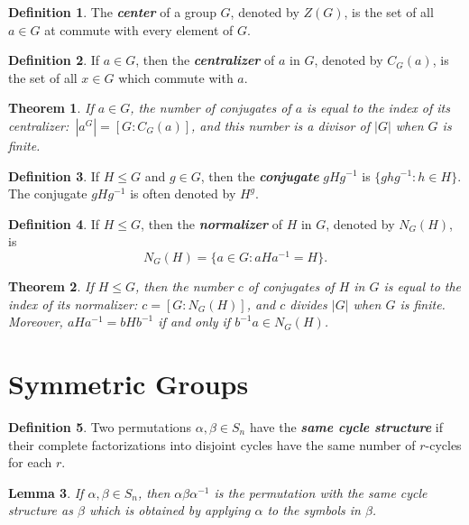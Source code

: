 \documentclass[12pt]{report}
\newtheorem{theorem}{Theorem}[chapter]
\newtheorem{lemma}[theorem]{Lemma}
\theoremstyle{definition}
\newtheorem*{definition}{Definition}
\newcommand{\term}[1]{\textbf{\textit{#1}}}
\begin{document}
\begin{definition}
	The \term{center} of a group $G$, denoted by $Z(G)$, is the set of all $a\in G$ at commute with every element of $G$.
\end{definition}

\begin{definition}
	If $a\in G$, then the \term{centralizer} of $a$ in $G$, denoted by $C_G(a)$, is the set of all $x\in G$ which commute with $a$.
\end{definition}

\begin{theorem}
	If $a\in G$, the number of conjugates of $a$ is equal to the index of its centralizer:\
	$|a^G|=[G:C_G(a)]$, and this number is a divisor of $|G|$ when $G$ is finite.
\end{theorem}

\begin{definition}
	If $H\leq G$ and $g\in G$, then the \term{conjugate} $gHg^{-1}$ is $\{ghg^{-1}:h\in H\}$. The conjugate $gHg^{-1}$ is often denoted by $H^g$.
\end{definition}

\begin{definition}
	If $H\leq G$, then the \term{normalizer} of $H$ in $G$, denoted by $N_G(H)$, is
	\[N_G(H)=\{a\in G:aHa^{-1}=H\}.\]
\end{definition}

\begin{theorem}
	If $H\leq G$, then the number $c$ of conjugates of $H$ in $G$ is equal to the index of its normalizer: $c=[G:N_G(H)]$, and $c$ divides $|G|$ when $G$ is finite.
	Moreover, $aHa^{-1}=bHb^{-1}$ if and only if $b^{-1}a\in N_G(H)$.
\end{theorem}

\section{Symmetric Groups}

\begin{definition}
	Two permutations $\alpha,\beta\in S_n$ have the \term{same cycle structure} if their complete factorizations into disjoint
	cycles have the same number of $r$-cycles for each $r$.
\end{definition}

\begin{lemma}
	If $\alpha,\beta\in S_n$, then $\alpha\beta\alpha^{-1}$ is the permutation with the same cycle structure as $\beta$ which is
	obtained by applying $\alpha$ to the symbols in $\beta$.
\end{lemma}
\end{document}
